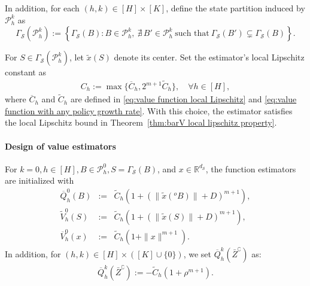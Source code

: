 \documentclass[final,supplement]{siamart251216}
\begin{document}
In addition, for each \((h,k)\in[H]\times[K]\), define the state partition induced by
\(\mathcal P_h^k\) as
\[
\Gamma_{\mathcal S}(\mathcal P_h^k)
:=
\left\{
\Gamma_{\mathcal S}(B):
B\in \mathcal P_h^k,\ 
\nexists\, B'\in \mathcal P_h^k
\ \text{such that}\
\Gamma_{\mathcal S}(B')\subsetneq \Gamma_{\mathcal S}(B)
\right\}.
\]


For $S\in\Gamma_{\mathcal S}(\mathcal P_h^k)$, let $\tilde x(S)$ denote its center. Set the estimator's local Lipschitz constant as
\begin{eqnarray}\label{eq:local lipschitz constant}
    C_{h}:=\max\Big\{\overline{C}_h, 2^{m+1}\widetilde{C}_h\Big\}, \quad \forall h\in [H],
\end{eqnarray}
 where $\overline C_h$ and $\widetilde C_h$ are defined  in \eqref{eq:value function local Lipschitz} and \eqref{eq:value function with any policy growth rate}. With this choice, the estimator satisfies the local Lipschitz bound in Theorem~\ref{thm:barV local lipschitz property}.


\paragraph{Design of value estimators} 

For $k=0, h\in [H],B\in \mathcal{P}_{h}^{0}, S=\Gamma_{\mathcal{S}}(B)$, and $x\in \mathbb{R}^{d_{\mathcal{S}}}$, the function estimators are initialized with
\begin{eqnarray}\label{eq:initial value for estimation}
        \overline{Q}_h^0(B)&:=& \widetilde{C}_{h}(1+(\|\tilde{x}(^{o}B)\|+D)^{m+1}),\nonumber\\
    \widetilde{V}_h^0(S)&:=&\widetilde{C}_{h}(1+(\|\tilde{x}(S)\|+D)^{m+1}),\nonumber\\
        \overline{V}_h^0(x) &:=& \widetilde{C}_h(1+\|x\|^{m+1}).
\end{eqnarray}
In addition, for $(h,k)\in [H]\times ([K]\cup\{0\})$, we set $\overline{Q}_h^k(\bar{Z}^{\complement})$ as:
\begin{eqnarray}\label{eq:initialize outside Q}
     \overline{Q}_h^k(\bar{Z}^{\complement}):=-\widetilde{C}_{h}(1+\rho^{m+1}).
\end{eqnarray}
\end{document}
